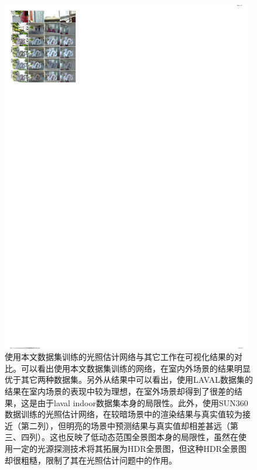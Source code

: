 \begin{figure}[!htbp]
    \centering
    \includegraphics[width=0.98\textwidth]{Img/eval-data-previous.pdf}
    \caption[本文数据集与其它工作的可视化结果比较]
    {使用本文数据集训练的光照估计网络与其它工作在可视化结果的对比。可以看出使用本文数据集训练的网络，在室内外场景的结果明显优于其它两种数据集。另外从结果中可以看出，使用LAVAL数据集的结果在室内场景的表现中较为理想，在室外场景却得到了很差的结果，这是由于laval indoor数据集本身的局限性。此外，使用SUN360数据训练的光照估计网络，在较暗场景中的渲染结果与真实值较为接近（第二列），但明亮的场景中预测结果与真实值却相差甚远（第三、四列）。这也反映了低动态范围全景图本身的局限性，虽然在使用一定的光源探测技术将其拓展为HDR全景图，但这种HDR全景图却很粗糙，限制了其在光照估计问题中的作用。}
    \label{fig:eval-data-previous}
\end{figure}